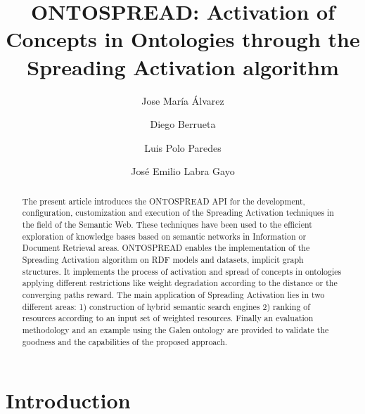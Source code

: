 \documentclass{llncs}
\begin{document}
\title{ONTOSPREAD: Activation of Concepts in Ontologies through the Spreading
Activation algorithm}


\author{Jose Mar\'{i}a \'{A}lvarez \and Diego Berrueta \and Luis Polo
Paredes \and Jos\'{e} Emilio Labra Gayo} 







\maketitle

\begin{abstract}
The present article introduces the ONTOSPREAD API for the development,
configuration, customization and execution of the Spreading Activation
techniques in the field of the Semantic Web. These techniques have been used to
the efficient exploration of knowledge bases based on semantic networks in
Information or Document Retrieval areas. ONTOSPREAD enables the implementation
of the Spreading Activation algorithm on RDF models and datasets, implicit graph structures. It
implements the process of activation and spread of concepts in ontologies
applying different restrictions like weight degradation according to the
distance or the converging paths reward. The main application of Spreading Activation
lies in two different areas: 1) construction of hybrid semantic search engines 2) ranking of
resources according to an input set of weighted resources. Finally an evaluation
methodology and an example using the Galen ontology are provided 
to validate the goodness and the capabilities of the proposed approach.
\end{abstract}

\section{Introduction}
\end{document}
